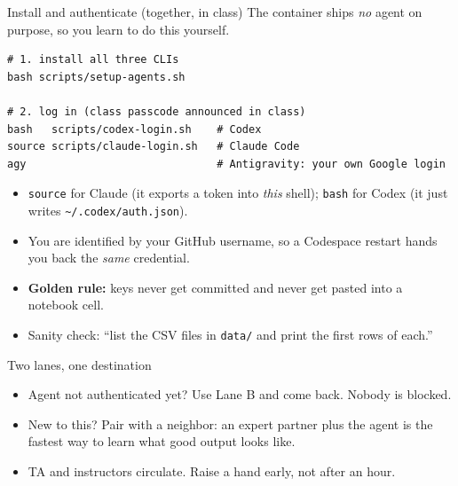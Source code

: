 \documentclass[aspectratio=169,11pt]{beamer}
\begin{document}
\begin{frame}[fragile]{Install and authenticate (together, in class)}
  The container ships \emph{no} agent on purpose, so you learn to do this yourself.
  \begin{lstlisting}
# 1. install all three CLIs
bash scripts/setup-agents.sh

# 2. log in (class passcode announced in class)
bash   scripts/codex-login.sh    # Codex
source scripts/claude-login.sh   # Claude Code
agy                              # Antigravity: your own Google login
  \end{lstlisting}
  \begin{itemize}
    \item \texttt{source} for Claude (it exports a token into \emph{this} shell);
          \texttt{bash} for Codex (it just writes \texttt{\textasciitilde{}/.codex/auth.json}).
    \item You are identified by your GitHub username, so a Codespace restart hands you
          back the \emph{same} credential.
    \item \textbf{Golden rule:} keys never get committed and never get pasted into a
          notebook cell.
    \item Sanity check: ``list the CSV files in \texttt{data/} and print the first rows
          of each.''
  \end{itemize}
\end{frame}

\begin{frame}{Two lanes, one destination}
  \begin{center}
  \end{center}
  \begin{itemize}
    \item Agent not authenticated yet? Use Lane B and come back. Nobody is blocked.
    \item New to this? Pair with a neighbor: an expert partner plus the agent is the
          fastest way to learn what good output looks like.
    \item TA and instructors circulate. Raise a hand early, not after an hour.
  \end{itemize}
\end{frame}
\end{document}

